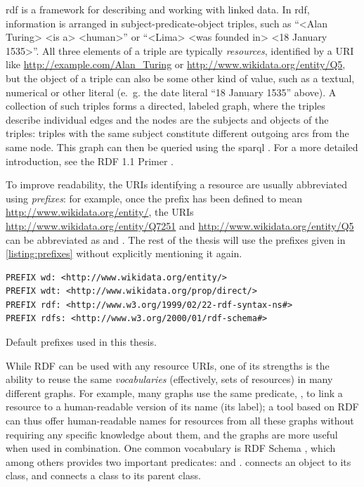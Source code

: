\acrfull{rdf}
\cite{Lanthaler:14:RCA}
is a framework for describing and working with linked data.
In \gls{rdf}, information is arranged in subject-predicate-object triples,
such as “<Alan Turing> <is a> <human>”
or “<Lima> <was founded in> <18 January 1535>”.
All three elements of a triple are typically \emph{resources},
identified by a URI like \url{http://example.com/Alan_Turing} or \url{http://www.wikidata.org/entity/Q5}, %
but the object of a triple can also be some other kind of value,
such as a textual, numerical or other literal
(e.~g. the date literal “18 January 1535” above). %
A collection of such triples forms a directed, labeled graph,
where the triples describe individual edges
and the nodes are the subjects and objects of the triples:
triples with the same subject constitute different outgoing arcs from the same node.
This graph can then be queried using the \acrlong{sparql} \cite{9569543}. %
For a more detailed introduction,
see the RDF 1.1 Primer \cite{Schreiber:14:RP}.

To improve readability, the URIs identifying a resource are usually abbreviated using \emph{prefixes}:
for example, once the prefix  has been defined to mean \url{http://www.wikidata.org/entity/},
the URIs \url{http://www.wikidata.org/entity/Q7251} and \url{http://www.wikidata.org/entity/Q5}
can be abbreviated as  and .
The rest of the thesis will use the prefixes given in \cref{listing:prefixes}
without explicitly mentioning it again.

\begin{lstfloat}
\begin{lstlisting}[language=sparql]
PREFIX wd: <http://www.wikidata.org/entity/>
PREFIX wdt: <http://www.wikidata.org/prop/direct/>
PREFIX rdf: <http://www.w3.org/1999/02/22-rdf-syntax-ns#>
PREFIX rdfs: <http://www.w3.org/2000/01/rdf-schema#>
\end{lstlisting}
\caption{Default prefixes used in this thesis.}
\label{listing:prefixes}
\end{lstfloat}

While RDF can be used with any resource URIs,
one of its strengths is the ability to reuse the same \emph{vocabularies}
(effectively, sets of resources)
in many different graphs.
For example, many graphs use the same predicate, ,
to link a resource to a human-readable version of its name (its label);
a tool based on RDF can thus offer human-readable names for resources from all these graphs
without requiring any specific knowledge about them,
and the graphs are more useful when used in combination.
One common vocabulary is RDF Schema \cite{Guha:14:RS}, %
which among others provides two important predicates:
 and .
 connects an object to its class,
and  connects a class to its parent class.

